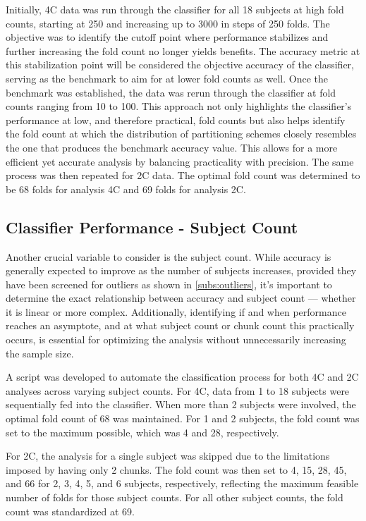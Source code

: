 Initially, \gls{4C} data was run through the classifier for all 18 subjects at high fold counts, starting at 250 and increasing up to 3000 in steps of 250 folds. The objective was to identify the cutoff point where performance stabilizes and further increasing the fold count no longer yields benefits. The accuracy metric at this stabilization point will be considered the objective accuracy of the classifier, serving as the benchmark to aim for at lower fold counts as well. Once the benchmark was established, the data was rerun through the classifier at fold counts ranging from 10 to 100. This approach not only highlights the classifier's performance at low, and therefore practical, fold counts but also helps identify the fold count at which the distribution of partitioning schemes closely resembles the one that produces the benchmark accuracy value. This allows for a more efficient yet accurate analysis by balancing practicality with precision. The same process was then repeated for \gls{2C} data. The optimal fold count was determined to be 68 folds for analysis \gls{4C} and 69 folds for analysis \gls{2C}. 

\subsection{Classifier Performance - Subject Count}

Another crucial variable to consider is the subject count. While accuracy is generally expected to improve as the number of subjects increases, provided they have been screened for outliers as shown in \autoref{subs:outliers}, it's important to determine the exact relationship between accuracy and subject count --- whether it is linear or more complex. Additionally, identifying if and when performance reaches an asymptote, and at what subject count or chunk count this practically occurs, is essential for optimizing the analysis without unnecessarily increasing the sample size.

A script was developed to automate the classification process for both \gls{4C} and \gls{2C} analyses across varying subject counts. For \gls{4C}, data from 1 to 18 subjects were sequentially fed into the classifier. When more than 2 subjects were involved, the optimal fold count of 68 was maintained. For 1 and 2 subjects, the fold count was set to the maximum possible, which was 4 and 28, respectively.

For \gls{2C}, the analysis for a single subject was skipped due to the limitations imposed by having only 2 chunks. The fold count was then set to 4, 15, 28, 45, and 66 for 2, 3, 4, 5, and 6 subjects, respectively, reflecting the maximum feasible number of folds for those subject counts. For all other subject counts, the fold count was standardized at 69.